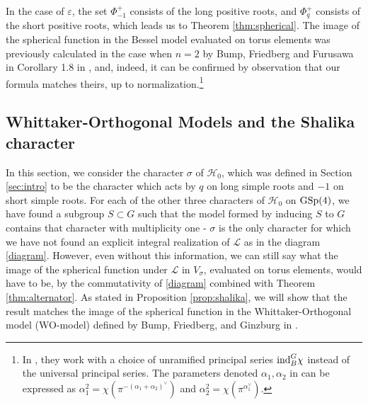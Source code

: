 \documentclass[11pt,letterpaper]{article}
\newcommand{\calL}{\mathcal{L}} %
\newcommand{\calH}{\mathcal{H}} %
\newcommand{\ve}{\varepsilon}
\newcommand{\GSp}{\textup{GSp}}
\newcommand{\ind}{\textup{ind}}
\theoremstyle{remark}
\numberwithin{equation}{section}
\begin{document}
In the case of $\ve$, the set $\Phi_{-1}^{+}$ consists of the long positive roots, and $\Phi_{q}^{+}$ consists of the short positive roots, which leads us to Theorem \ref{thm:spherical}. The image of the spherical function in the Bessel model evaluated on torus elements was previously calculated in the case when $n=2$ by Bump, Friedberg and Furusawa in Corollary 1.8 in \cite{BFF}, and, indeed, it can be confirmed by observation that our formula matches theirs, up to normalization.\footnote{In \cite{BFF}, they work with a choice of unramified principal series $\ind_B^G \chi$ instead of the universal principal series. The parameters denoted $\alpha_1,\alpha_2$ in \cite{BBF2} can be expressed as $\alpha_1^{2} = \chi(\pi^{-(\alpha_1+\alpha_2)^{\vee}})$ and $\alpha_2^2 = \chi(\pi^{\alpha_1^{\vee}})$.}

 
\subsection{Whittaker-Orthogonal Models and the Shalika character}\label{sec:womodels}

In this section, we consider the character $\sigma$ of $\calH_0$, which was defined in Section \ref{sec:intro} to be the character which acts by $q$ on long simple roots and $-1$ on short simple roots. For each of the other three characters of $\calH_0$ on $\GSp(4)$, we have found a subgroup $S \subset G$ such that the model formed by inducing $S$ to $G$ contains that character with multiplicity one - $\sigma$ is the only character for which we have not found an explicit integral realization of $\calL$ as in the diagram \eqref{diagram}. However, even without this information, we can still say what the image of the spherical function under $\calL$ in $V_{\sigma}$, evaluated on torus elements, would have to be, by the commutativity of \eqref{diagram} combined with Theorem \ref{thm:alternator}. As stated in Proposition \ref{prop:shalika}, we will show that the result matches the image of the spherical function in the Whittaker-Orthogonal model (WO-model) defined by Bump, Friedberg, and Ginzburg in \cite{BFG}.
\end{document}
